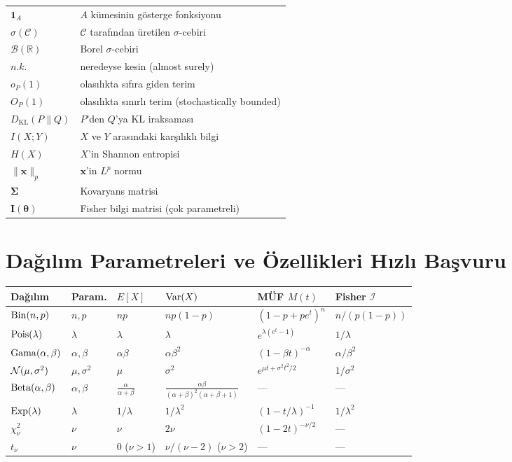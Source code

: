 \begin{center}
\begin{tabular}{p{4cm}p{9cm}}
$\mathbf{1}_A$ & $A$ kümesinin gösterge fonksiyonu \\
$\sigma(\mathcal{C})$ & $\mathcal{C}$ tarafından üretilen $\sigma$-cebiri \\
$\mathcal{B}(\mathbb{R})$ & Borel $\sigma$-cebiri \\
$n.k.$ & neredeyse kesin (almost surely) \\
$o_P(1)$ & olasılıkta sıfıra giden terim \\
$O_P(1)$ & olasılıkta sınırlı terim (stochastically bounded) \\
$D_\mathrm{KL}(P\|Q)$ & $P$'den $Q$'ya KL iraksaması \\
$I(X;Y)$ & $X$ ve $Y$ arasındaki karşılıklı bilgi \\
$H(X)$ & $X$'in Shannon entropisi \\
$\|\mathbf{x}\|_p$ & $\mathbf{x}$'in $L^p$ normu \\
$\boldsymbol\Sigma$ & Kovaryans matrisi \\
$\mathbf{I}(\boldsymbol\theta)$ & Fisher bilgi matrisi (çok parametreli) \\
\hline
\end{tabular}
\end{center}

\section{Dağılım Parametreleri ve Özellikleri Hızlı Başvuru}
\label{app:dagılım_hizli}

\begin{center}
\renewcommand{\arraystretch}{1.3}
\begin{tabular}{llllll}
\hline
\textbf{Dağılım} & \textbf{Param.} & $E[X]$ & $\operatorname{Var}(X)$ & \textbf{MÜF} $M(t)$ & \textbf{Fisher} $\mathcal{I}$ \\
\hline
$\operatorname{Bin}(n,p)$ & $n,p$ & $np$ & $np(1-p)$ & $(1-p+pe^t)^n$ & $n/(p(1-p))$ \\
$\operatorname{Pois}(\lambda)$ & $\lambda$ & $\lambda$ & $\lambda$ & $e^{\lambda(e^t-1)}$ & $1/\lambda$ \\
$\operatorname{Gama}(\alpha,\beta)$ & $\alpha,\beta$ & $\alpha\beta$ & $\alpha\beta^2$ & $(1-\beta t)^{-\alpha}$ & $\alpha/\beta^2$ \\
$\mathcal{N}(\mu,\sigma^2)$ & $\mu,\sigma^2$ & $\mu$ & $\sigma^2$ & $e^{\mu t+\sigma^2t^2/2}$ & $1/\sigma^2$ \\
$\operatorname{Beta}(\alpha,\beta)$ & $\alpha,\beta$ & $\frac{\alpha}{\alpha+\beta}$ & $\frac{\alpha\beta}{(\alpha+\beta)^2(\alpha+\beta+1)}$ & --- & --- \\
$\operatorname{Exp}(\lambda)$ & $\lambda$ & $1/\lambda$ & $1/\lambda^2$ & $(1-t/\lambda)^{-1}$ & $1/\lambda^2$ \\
$\chi^2_\nu$ & $\nu$ & $\nu$ & $2\nu$ & $(1-2t)^{-\nu/2}$ & --- \\
$t_\nu$ & $\nu$ & $0$ ($\nu>1$) & $\nu/(\nu-2)$ ($\nu>2$) & --- & --- \\
\hline
\end{tabular}
\end{center}

